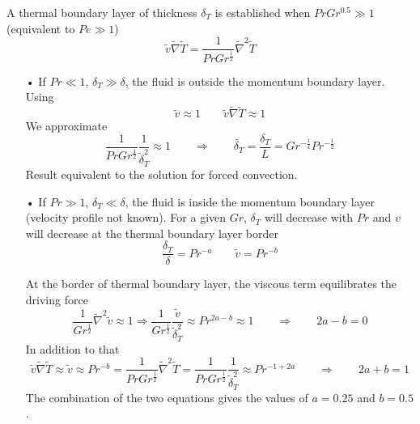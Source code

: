 		A thermal boundary layer of thickness $\delta _T$ is established when $Pr Gr^{0.5} \gg 1$ (equivalent to $Pe \gg 1$) 
		\begin{equation}
			\tilde{v} \tilde{\nabla} \tilde{T} = \frac{1}{Pr Gr^{\frac{1}{2}}} \tilde{\nabla}^2 \tilde{T}
		\end{equation}
		\begin{itemize}
		\item[•]	If $Pr \ll 1$, $\delta _T \gg \delta$, the fluid is outside the momentum boundary layer. Using
		\begin{equation}
			\tilde{v}\approx 1 \qquad \tilde{v}\tilde{\nabla}\tilde{T} \approx 1
		\end{equation}
		We approximate
		\begin{equation}
			\frac{1}{Pr Gr^{\frac{1}{2}}} \frac{1}{\tilde{\delta} _T^2}\approx 1 \qquad \Rightarrow \qquad \tilde{\delta _T} = \frac{\delta _T}{L} = Gr^{-\frac{1}{4}}Pr^{-\frac{1}{2}}
		\end{equation}
		Result equivalent to the solution for forced convection. 
		
		\item[•] If $Pr \gg 1$, $\delta _T \ll \delta$, the fluid is inside the momentum boundary layer (velocity profile not known). For a given $Gr$, $\delta _T$ will decrease with $Pr$ and $v$ will decrease at the thermal boundary layer border 
		\begin{equation}
			\frac{\delta _T}{\delta} = Pr ^{-a} \qquad \tilde{v} = Pr ^{-b}
		\end{equation}
		
		At the border of thermal boundary layer, the viscous term equilibrates the driving force
		\begin{equation}
		\frac{1}{Gr ^{\frac{1}{2}}} \tilde{\nabla} ^2 \tilde{v} \approx 1 \Rightarrow \frac{1}{Gr ^{\frac{1}{2}}} \frac{\tilde{v}}{\tilde{\delta}_T ^2} \approx Pr ^{2a-b} \approx 1 \qquad \Rightarrow \qquad 2a - b = 0 
		\end{equation}
		In addition to that 
		\begin{equation}
			\tilde{v} \tilde{\nabla} \tilde{T} \approx \tilde{v} \approx Pr ^{-b} =\frac{1}{PrGr ^{\frac{1}{2}}}\tilde{\nabla}^2 \tilde{T} = \frac{1}{PrGr ^{\frac{1}{2}}} \frac{1}{\tilde{\delta}_T^2} \approx Pr^{-1+2a} \qquad \Rightarrow \qquad 2a +b = 1
		\end{equation}
		The combination of the two equations gives the values of $a = 0.25$ and $b = 0.5$.
		\end{itemize}
		
